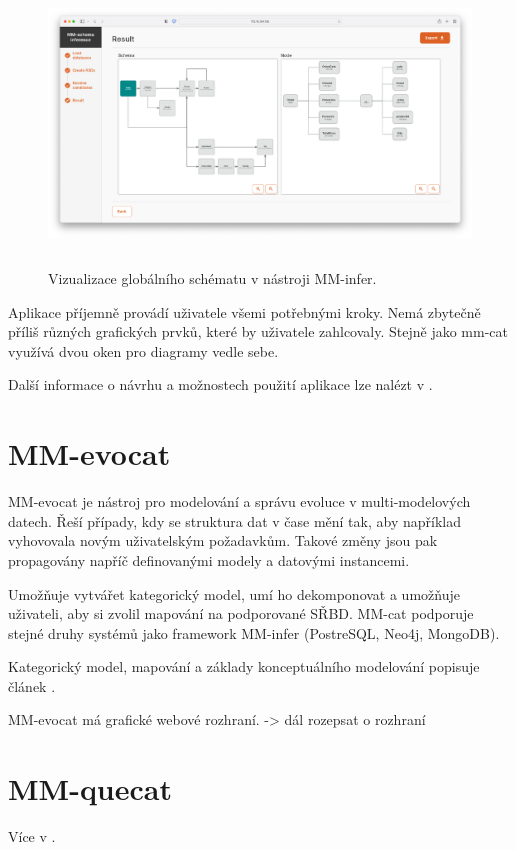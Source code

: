 \begin{figure}[htb]
  \centering
  \includegraphics[height=75mm]{../img/mm-infer-result}
  \caption{Vizualizace globálního schématu v nástroji MM-infer.}
  \label{obr01:mm-infer-result}
\end{figure}

Aplikace příjemně provádí uživatele všemi potřebnými kroky. Nemá zbytečně příliš různých grafických prvků, které by uživatele zahlcovaly. Stejně jako mm-cat využívá dvou oken pro diagramy vedle sebe.

Další informace o návrhu a možnostech použití aplikace lze nalézt v \citet{MMinfer}.

\section{MM-evocat}

MM-evocat je nástroj pro modelování a správu evoluce v multi-modelových datech. Řeší případy, kdy se struktura dat v čase mění tak, aby například vyhovovala novým uživatelským požadavkům. Takové změny jsou pak propagovány napříč definovanými modely a datovými instancemi.

Umožňuje vytvářet kategorický model, umí ho dekomponovat a umožňuje uživateli, aby si zvolil mapování na podporované SŘBD. MM-cat podporuje stejné druhy systémů jako framework MM-infer (PostreSQL, Neo4j, MongoDB).

Kategorický model, mapování a základy konceptuálního modelování popisuje článek \citet{MMevocat}.

MM-evocat má grafické webové rozhraní. -> dál rozepsat o rozhraní

\section{MM-quecat}

Více v \citet{MMquecat}.

